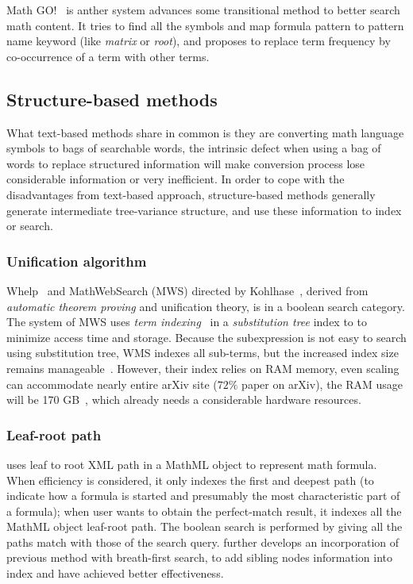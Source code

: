 Math GO!~\cite{Adeel_mathgo} is anther system advances some transitional method to better search math content. It tries to find all the symbols and map formula pattern to pattern name keyword (like \textit{matrix} or \textit{root}), and proposes to replace term frequency by co-occurrence of a term with other terms.

\subsection{Structure-based methods}
What text-based methods share in common is they are converting math language symbols to bags of searchable words, the intrinsic defect when using a bag of words to replace structured information will make conversion process lose considerable information or very inefficient.
In order to cope with the disadvantages from text-based approach, structure-based methods generally generate intermediate tree-variance structure, and use these information to index or search.

\subsubsection*{Unification algorithm}
Whelp~\cite{whelp04} and MathWebSearch (MWS) directed by Kohlhase~\cite{Kohlhase06,Kohlhase0p4,Kohlhase0p5}, derived from \textit{automatic theorem proving} and unification theory, is in a boolean search category. The system of MWS uses \textit{term indexing}~\cite{graf96} in a \textit{substitution tree} index to to minimize access time and storage. Because the subexpression is not easy to search using substitution tree, WMS indexes all sub-terms, but the increased index size remains manageable~\cite{Kohlhase06}. However, their index relies on RAM memory, even scaling can accommodate nearly entire arXiv site ($72\%$ paper on arXiv), the RAM usage will be 170 GB~\cite{Kohlhase0p5}, which already needs a considerable hardware resources.

\subsubsection*{Leaf-root path}
\cite{MathMLleafroot} uses leaf to root XML path in a MathML object to represent math formula. When efficiency is considered, it only indexes the first and deepest path (to indicate how a formula is started and presumably the most characteristic part of a formula); 
when user wants to obtain the perfect-match result, it indexes all the MathML object leaf-root path. The boolean search is performed by giving all the paths match with those of the search query. 
\cite{sefobyfo} further develops an incorporation of previous method with breath-first search, to add sibling nodes information into index and have achieved better effectiveness.

